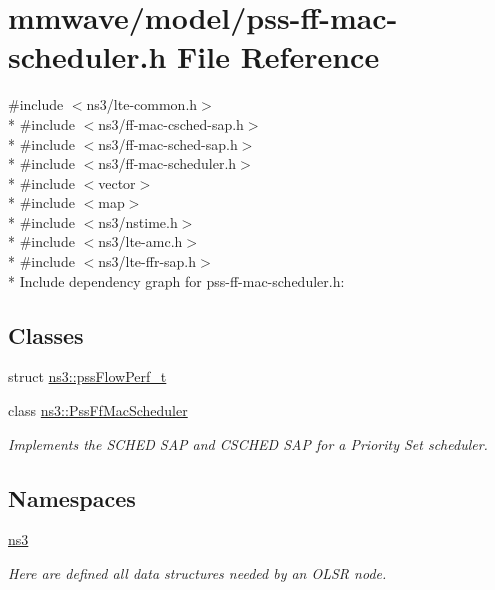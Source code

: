 \hypertarget{mmwave_2model_2pss-ff-mac-scheduler_8h}{}\section{mmwave/model/pss-\/ff-\/mac-\/scheduler.h File Reference}
\label{mmwave_2model_2pss-ff-mac-scheduler_8h}
{\ttfamily \#include $<$ns3/lte-\/common.\+h$>$}\\*
{\ttfamily \#include $<$ns3/ff-\/mac-\/csched-\/sap.\+h$>$}\\*
{\ttfamily \#include $<$ns3/ff-\/mac-\/sched-\/sap.\+h$>$}\\*
{\ttfamily \#include $<$ns3/ff-\/mac-\/scheduler.\+h$>$}\\*
{\ttfamily \#include $<$vector$>$}\\*
{\ttfamily \#include $<$map$>$}\\*
{\ttfamily \#include $<$ns3/nstime.\+h$>$}\\*
{\ttfamily \#include $<$ns3/lte-\/amc.\+h$>$}\\*
{\ttfamily \#include $<$ns3/lte-\/ffr-\/sap.\+h$>$}\\*
Include dependency graph for pss-\/ff-\/mac-\/scheduler.h\+:
\subsection*{Classes}
\begin{DoxyCompactItemize}
\item 
struct \hyperlink{structns3_1_1pssFlowPerf__t}{ns3\+::pss\+Flow\+Perf\+\_\+t}
\item 
class \hyperlink{classns3_1_1PssFfMacScheduler}{ns3\+::\+Pss\+Ff\+Mac\+Scheduler}
\begin{DoxyCompactList}\small\item\em Implements the S\+C\+H\+ED S\+AP and C\+S\+C\+H\+ED S\+AP for a Priority Set scheduler. \end{DoxyCompactList}\end{DoxyCompactItemize}
\subsection*{Namespaces}
\begin{DoxyCompactItemize}
\item 
 \hyperlink{namespacens3}{ns3}
\begin{DoxyCompactList}\small\item\em Here are defined all data structures needed by an O\+L\+SR node. \end{DoxyCompactList}\end{DoxyCompactItemize}

